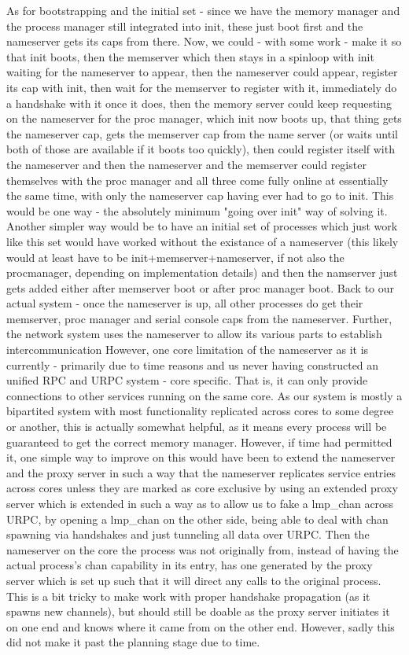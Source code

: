 As for bootstrapping and the initial set - since we have the memory manager and the process manager still integrated into init, these just boot first and the nameserver gets its caps from there. Now, we could - with some work - make it so that init boots, then the memserver which then stays in a spinloop with init waiting for the nameserver to appear, then the nameserver could appear, register its cap with init, then wait for the memserver to register with it, immediately do a handshake with it once it does, then the memory server could keep requesting on the nameserver for the proc manager, which init now boots up, that thing gets the nameserver cap, gets the memserver cap from the name server (or waits until both of those are available if it boots too quickly), then could register itself with the nameserver and then the nameserver and the memserver could register themselves with the proc manager and all three come fully online at essentially the same time, with only the nameserver cap having ever had to go to init. This would be one way - the absolutely minimum "going over init" way of solving it.
Another simpler way would be to have an initial set of processes which just work like this set would have worked without the existance of a nameserver (this likely would at least have to be init+memserver+nameserver, if not also the procmanager, depending on implementation details) and then the namserver just gets added either after memserver boot or after proc manager boot.
Back to our actual system - once the nameserver is up, all other processes do get their memserver, proc manager and serial console caps from the nameserver. Further, the network system uses the nameserver to allow its various parts to establish intercommunication
However, one core limitation of the nameserver as it is currently - primarily due to time reasons and us never having constructed an unified RPC and URPC system - core specific. That is, it can only provide connections to other services running on the same core. As our system is mostly a bipartited system with most functionality replicated across cores to some degree or another, this is actually somewhat helpful, as it means every process will be guaranteed to get the correct memory manager.
However, if time had permitted it, one simple way to improve on this would have been to extend the nameserver and the proxy server in such a way that the nameserver replicates service entries across cores unless they are marked as core exclusive by using an extended proxy server which is extended in such a way as to allow us to fake a lmp\_chan across URPC, by opening a lmp\_chan on the other side, being able to deal with chan spawning via handshakes and just tunneling all data over URPC. Then the nameserver on the core the process was not originally from, instead of having the actual process's chan capability in its entry, has one generated by the proxy server which is set up such that it will direct any calls to the original process.
This is a bit tricky to make work with proper handshake propagation (as it spawns new channels), but should still be doable as the proxy server initiates it on one end and knows where it came from on the other end.
However, sadly this did not make it past the planning stage due to time.

